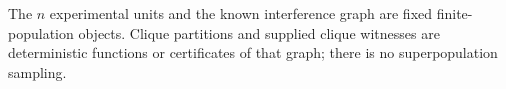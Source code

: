 The \(n\) experimental units and the known interference graph are fixed finite-population objects.  Clique partitions and supplied clique witnesses are deterministic functions or certificates of that graph; there is no superpopulation sampling.